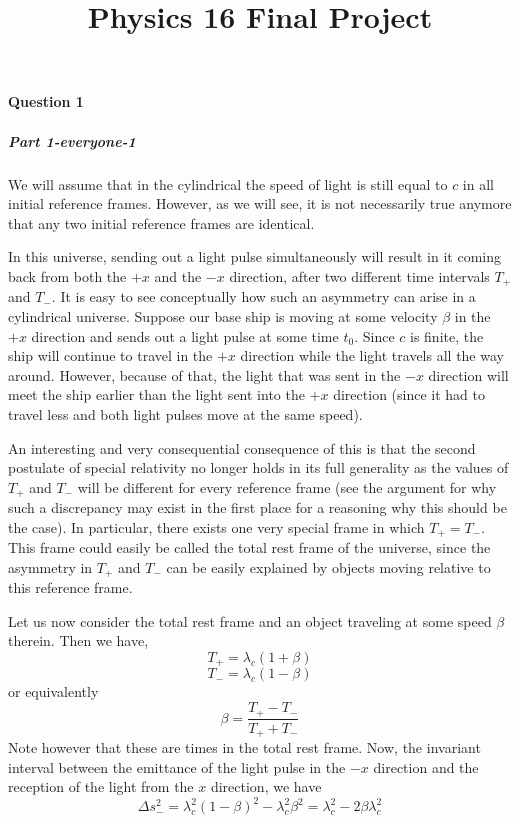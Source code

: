 \title{Physics 16 Final Project}
\newcommand{\f}{\frac} 
\newcommand{\om}{\omega}
\newcommand{\pdif}[2]{\f{\partial #1}{\partial #2}}
\newcommand{\dif}[2]{\f{d#1}{d#2}}
\newcommand{\eqdef}{\equiv}

\paragraph{Question 1}
\subparagraph*{Part 1-everyone-1}
We will assume that in the cylindrical the speed of light is still equal to $c$ in all initial reference frames. However, as we will see, it is not necessarily true anymore that any two initial reference frames are identical.  \par 
In this universe, sending out a light pulse simultaneously will result in it coming back from both the $+x$ and the $-x$ direction, after two different time intervals $T_+$ and $T_-$. It is easy to see conceptually how such an asymmetry can arise in a cylindrical universe. Suppose our base ship is moving at some velocity $\beta$ in the $+x$ direction and sends out a light pulse at some time $t_0$. Since $c$ is finite, the ship will continue to travel in the $+x$ direction while the light travels all the way around. However, because of that, the light that was sent in the $-x$ direction will meet the ship earlier than the light sent into the $+x$ direction (since it had to travel less and both light pulses move at the same speed). \par 
An interesting and very consequential consequence of this is that the second postulate of special relativity no longer holds in its full generality as the values of $T_+$ and $T_-$ will be different for every reference frame (see the argument for why such a discrepancy may exist in the first place for a reasoning why this should be the case). In particular, there exists one very special frame in which $T_+=T_-$. This frame could easily be called the total rest frame of the universe, since the asymmetry in $T_+$ and $T_-$ can be easily explained by objects moving relative to this reference frame. \par 
Let us now consider the total rest frame and an object traveling at some speed $\beta$ therein. Then we have,
\[ T_+ = \lambda_c(1+\beta) \]
\[ T_- = \lambda_c(1-\beta) \]
or equivalently
\[ \beta = \frac{T_+-T_-}{T_++T_-} \]
Note however that these are times in the total rest frame. 
Now, the invariant interval between the emittance of the light pulse in the $-x$ direction and the reception of the light from the $x$ direction, we have
\[ \Delta s_-^2 = \lambda_c^2(1-\beta)^2 - \lambda_c^2\beta^2 = \lambda_c^2 - 2\beta\lambda_c^2 \]
